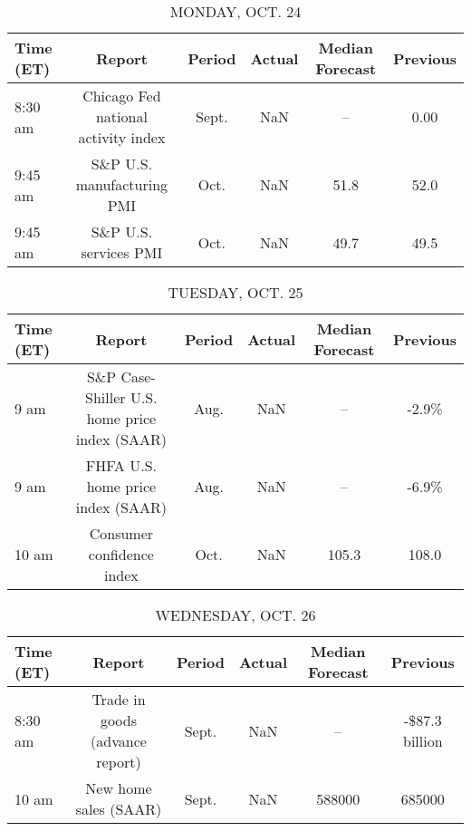 \documentclass{article}%
\begin{document}
%
\normalsize%


\begin{table}[htbp]%
\caption{MONDAY, OCT. 24}%
\centering%
\begin{adjustbox}{width=1\textwidth}%
\begin{tabular}{lccccc}
\toprule
Time (ET) &                              Report & Period & Actual & Median Forecast & Previous \\
\midrule
  8:30 am & Chicago Fed national activity index &  Sept. &    NaN &              -- &     0.00 \\
  9:45 am &          S\&P U.S. manufacturing PMI &   Oct. &    NaN &            51.8 &     52.0 \\
  9:45 am &               S\&P U.S. services PMI &   Oct. &    NaN &            49.7 &     49.5 \\
\bottomrule
\end{tabular}
%
\end{adjustbox}%
\end{table}

%


\begin{table}[htbp]%
\caption{TUESDAY, OCT. 25}%
\centering%
\begin{adjustbox}{width=1\textwidth}%
\begin{tabular}{lccccc}
\toprule
Time (ET) &                                        Report & Period & Actual & Median Forecast & Previous \\
\midrule
     9 am & S\&P Case-Shiller U.S. home price index (SAAR) &   Aug. &    NaN &              -- &    -2.9\% \\
     9 am &             FHFA U.S. home price index (SAAR) &   Aug. &    NaN &              -- &    -6.9\% \\
    10 am &                     Consumer confidence index &   Oct. &    NaN &           105.3 &    108.0 \\
\bottomrule
\end{tabular}
%
\end{adjustbox}%
\end{table}

%


\begin{table}[htbp]%
\caption{WEDNESDAY, OCT. 26}%
\centering%
\begin{adjustbox}{width=1\textwidth}%
\begin{tabular}{lccccc}
\toprule
Time (ET) &                          Report & Period & Actual & Median Forecast &       Previous \\
\midrule
  8:30 am & Trade in goods (advance report) &  Sept. &    NaN &              -- & -\$87.3 billion \\
    10 am &           New home sales (SAAR) &  Sept. &    NaN &          588000 &         685000 \\
\bottomrule
\end{tabular}
%
\end{adjustbox}%
\end{table}
\end{document}

